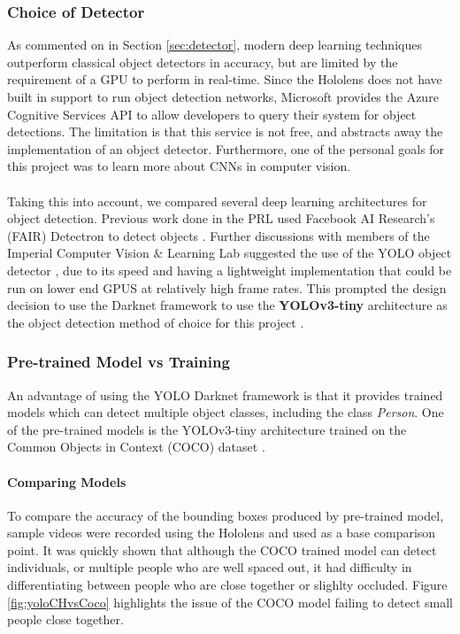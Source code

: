 \subsubsection{Choice of Detector}
As commented on in Section \ref{sec:detector}, modern deep learning techniques outperform classical object detectors in accuracy, but are limited by the requirement of a GPU to perform in real-time. Since the Hololens does not have built in support to run object detection networks, Microsoft provides the Azure Cognitive Services API to allow developers to query their system for object detections. The limitation is that this service is not free, and abstracts away the implementation of an object detector. Furthermore, one of the personal goals for this project was to learn more about CNNs in computer vision.

\paragraph{} Taking this into account, we compared several deep learning architectures for object detection. Previous work done in the PRL used Facebook AI Research's (FAIR) Detectron to detect objects \cite{Chacon-Quesada, Detectron2018, Rena}. Further discussions with members of the Imperial Computer Vision \& Learning Lab suggested the use of the YOLO object detector \cite{Redmon}, due to its speed and having a lightweight implementation that could be run on lower end GPUS at relatively high frame rates. This prompted the design decision to use the Darknet framework to use the \textbf{YOLOv3-tiny} architecture as the object detection method of choice for this project \cite{Redmon2018}.

\subsubsection{Pre-trained Model vs Training} \label{sec:designYOLO}
An advantage of using the YOLO Darknet framework is that it provides trained models which can detect multiple object classes, including the class \textit{Person}. One of the pre-trained models is the YOLOv3-tiny architecture trained on the Common Objects in Context (COCO) dataset \cite{Lin}.

\paragraph{Comparing Models} To compare the accuracy of the bounding boxes produced by pre-trained model, sample videos were recorded using the Hololens and used as a base comparison point. It was quickly shown that although the COCO trained model can detect individuals, or multiple people who are well spaced out, it had difficulty in differentiating between people who are close together or slighlty occluded. Figure \ref{fig:yoloCHvsCoco} highlights the issue of the COCO model failing to detect small people close together.

